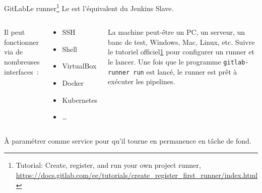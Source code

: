 \documentclass{beamer}
\begin{document}
    \begin{frame}{GitLab}{Le runner\footnote{\label{configrunner}Tutorial: Create, register, and run your own project runner, \url{https://docs.gitlab.com/ee/tutorials/create\_register\_first\_runner/index.html}}}
        \transdissolve
        Le  est l'équivalent du Jenkins Slave.
        \bigbreak
        \begin{columns}
            Il peut fonctionner via de nombreuses interfaces~:
            \begin{tiny}
                \begin{itemize}
                    \item SSH
                    \item Shell
                    \item VirtualBox
                    \item Docker
                    \item Kubernetes
                    \item \ldots
                \end{itemize}
            \end{tiny}
            La machine peut-être un PC, un serveur, un banc de test, Windows, Mac, Linux, etc.
            \bigbreak
            Suivre le tutoriel officiel\cref{configrunner} pour configurer un runner et le lancer.
            Une fois que le programme \lstinline{gitlab-runner run} est lancé, le runner est prêt à exécuter les pipelines.
        \end{columns}
        \begin{dangercolorbox}
            À paramétrer comme service pour qu'il tourne en permanence en tâche de fond.
        \end{dangercolorbox}
    \end{frame}
\end{document}
